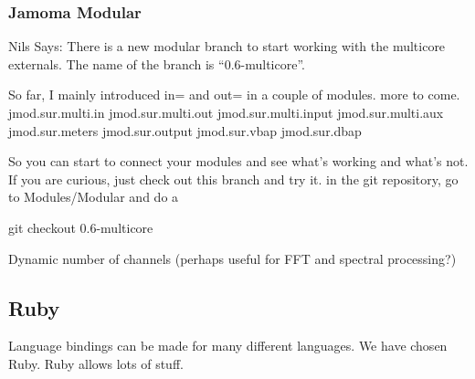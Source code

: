 \documentclass[twoside,a4paper]{article}
\begin{document}
\subsubsection{Jamoma Modular} %


Nils Says:
There is a new modular branch to start working with the multicore 
externals. The name of the branch is ``0.6-multicore''.

So far, I mainly introduced in= and out= in a couple of modules. more to come.
jmod.sur.multi.in
jmod.sur.multi.out
jmod.sur.multi.input
jmod.sur.multi.aux
jmod.sur.meters
jmod.sur.output
jmod.sur.vbap
jmod.sur.dbap


So you can start to connect your modules and see what's working and 
what's not.
If you are curious, just check out this branch and try it.
in the git repository, go to Modules/Modular and do a

git checkout 0.6-multicore


Dynamic number of channels (perhaps useful for FFT and spectral processing?)





\subsection{Ruby} %

Language bindings can be made for many different languages.  We have chosen Ruby.  Ruby allows lots of stuff.  
\end{document}
